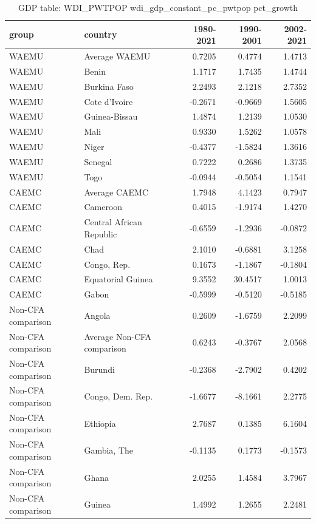 \begin{table}

\caption{GDP table: WDI_PWTPOP wdi_gdp_constant_pc_pwtpop pct_growth}
\centering
\begin{tabular}[t]{llrrr}
\toprule
group & country & 1980-2021 & 1990-2001 & 2002-2021\\
\midrule
WAEMU & Average WAEMU & 0.7205 & 0.4774 & 1.4713\\
WAEMU & Benin & 1.1717 & 1.7435 & 1.4744\\
WAEMU & Burkina Faso & 2.2493 & 2.1218 & 2.7352\\
WAEMU & Cote d'Ivoire & -0.2671 & -0.9669 & 1.5605\\
WAEMU & Guinea-Bissau & 1.4874 & 1.2139 & 1.0530\\
\addlinespace
WAEMU & Mali & 0.9330 & 1.5262 & 1.0578\\
WAEMU & Niger & -0.4377 & -1.5824 & 1.3616\\
WAEMU & Senegal & 0.7222 & 0.2686 & 1.3735\\
WAEMU & Togo & -0.0944 & -0.5054 & 1.1541\\
CAEMC & Average CAEMC & 1.7948 & 4.1423 & 0.7947\\
\addlinespace
CAEMC & Cameroon & 0.4015 & -1.9174 & 1.4270\\
CAEMC & Central African Republic & -0.6559 & -1.2936 & -0.0872\\
CAEMC & Chad & 2.1010 & -0.6881 & 3.1258\\
CAEMC & Congo, Rep. & 0.1673 & -1.1867 & -0.1804\\
CAEMC & Equatorial Guinea & 9.3552 & 30.4517 & 1.0013\\
\addlinespace
CAEMC & Gabon & -0.5999 & -0.5120 & -0.5185\\
Non-CFA comparison & Angola & 0.2609 & -1.6759 & 2.2099\\
Non-CFA comparison & Average Non-CFA comparison & 0.6243 & -0.3767 & 2.0568\\
Non-CFA comparison & Burundi & -0.2368 & -2.7902 & 0.4202\\
Non-CFA comparison & Congo, Dem. Rep. & -1.6677 & -8.1661 & 2.2775\\
\addlinespace
Non-CFA comparison & Ethiopia & 2.7687 & 0.1385 & 6.1604\\
Non-CFA comparison & Gambia, The & -0.1135 & 0.1773 & -0.1573\\
Non-CFA comparison & Ghana & 2.0255 & 1.4584 & 3.7967\\
Non-CFA comparison & Guinea & 1.4992 & 1.2655 & 2.2481\\

\end{tabular}
\end{table}

